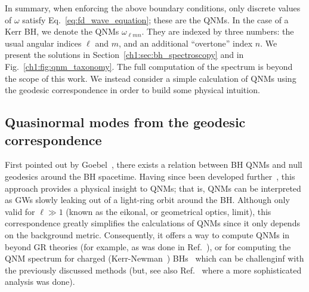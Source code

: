 In summary, when enforcing the above boundary conditions, only discrete values of $\omega$ satisfy Eq.~\ref{eq:fd_wave_equation}; these are the QNMs.
In the case of a Kerr BH, we denote the QNMs $\omega_{\ell m n}$.
They are indexed by three numbers: the usual angular indices $\ell$ and $m$, and an additional ``overtone'' index $n$.
We present the solutions in Section~\ref{ch1:sec:bh_spectroscopy} and in Fig.~\ref{ch1:fig:qnm_taxonomy}.
The full computation of the spectrum is beyond the scope of this work.
We instead consider a simple calculation of QNMs using the geodesic correspondence in order to build some physical intuition.

\subsection{Quasinormal modes from the geodesic correspondence}

First pointed out by Goebel~\cite{1972ApJ...172L..95G}, there exists a relation between BH QNMs and null geodesics around the BH spacetime.
Having since been developed further~\cite{BLOME1984231, Ferrari:1984ozr, Ferrari:1984zz, Cardoso:2008bp, Yang:2012he}, this approach provides a physical insight to QNMs; that is, QNMs can be interpreted as GWs slowly leaking out of a light-ring orbit around the BH. 
Although only valid for $\ell \gg 1$ (known as the eikonal, or geometrical optics, limit), this correspondence greatly simplifies the calculations of QNMs since it only depends on the background metric.
Consequently, it offers a way to compute QNMs in beyond GR theories (for example, as was done in Ref.~\cite{Blazquez-Salcedo:2016enn}), or for computing the QNM spectrum for charged (Kerr-Newman~\cite{Newman:1965my}) BHs~\cite{Cardoso:2016olt, Wang:2021uuh} which can be challenginf with the previously discussed methods (but, see also Ref.~\cite{Carullo:2021oxn} where a more sophisticated analysis was done).

